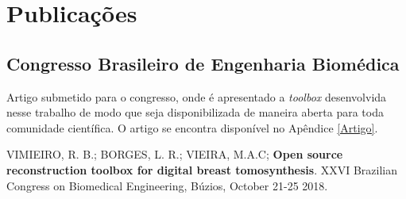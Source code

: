 \chapter[Publicações]{Publicações}\label{Capitulo8}

\section{Congresso Brasileiro de Engenharia Biomédica}

Artigo submetido para o congresso, onde é apresentado a \textit{toolbox} desenvolvida nesse trabalho de modo que seja disponibilizada de maneira aberta para toda comunidade científica. O artigo se encontra disponível no Apêndice \ref{Artigo}.

VIMIEIRO, R. B.; BORGES, L. R.; VIEIRA, M.A.C; \textbf{Open source reconstruction toolbox for digital breast tomosynthesis}. XXVI Brazilian Congress on Biomedical Engineering, Búzios, October 21-25 2018.

